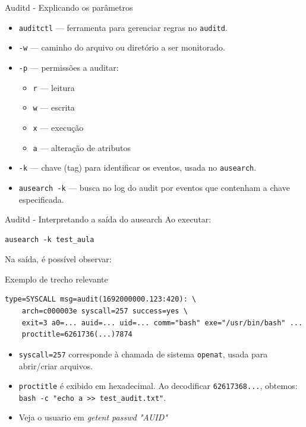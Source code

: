 \begin{frame}{Auditd - Explicando os parâmetros}
\begin{itemize}
    \item \texttt{auditctl} — ferramenta para gerenciar regras no \texttt{auditd}.
    \item \texttt{-w} — caminho do arquivo ou diretório a ser monitorado.
    \item \texttt{-p} — permissões a auditar:
    \begin{itemize}
        \item \texttt{r} — leitura
        \item \texttt{w} — escrita
        \item \texttt{x} — execução
        \item \texttt{a} — alteração de atributos
    \end{itemize}
    \item \texttt{-k} — chave (tag) para identificar os eventos, usada no \texttt{ausearch}.
    \item \texttt{ausearch -k} — busca no log do audit por eventos que contenham a chave especificada.
\end{itemize}
\end{frame}

\begin{frame}[fragile]{Auditd - Interpretando a saída do ausearch}
Ao executar:
\begin{verbatim}
ausearch -k test_aula
\end{verbatim}

Na saída, é possível observar:

\begin{block}{Exemplo de trecho relevante}
\begin{verbatim}
type=SYSCALL msg=audit(1692000000.123:420): \
    arch=c000003e syscall=257 success=yes \
    exit=3 a0=... auid=... uid=... comm="bash" exe="/usr/bin/bash" ...
    proctitle=6261736(...)7874
\end{verbatim}
\end{block}

\begin{itemize}
    \item \texttt{syscall=257} corresponde à chamada de sistema \texttt{openat}, usada para abrir/criar arquivos.
    \item \texttt{proctitle} é exibido em hexadecimal.  
          Ao decodificar \texttt{62617368...}, obtemos:  
          \texttt{bash -c "echo a >> test\_audit.txt"}.

    \item Veja o usuario em \textit{getent passwd "AUID"}
\end{itemize}
\end{frame}


